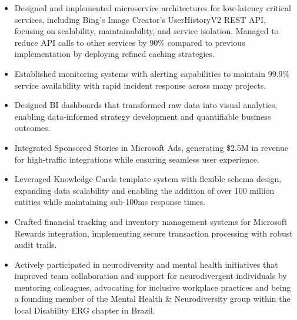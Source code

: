 \begin{itemize}
    \item \scriptsize{Designed and implemented microservice architectures for low-latency critical
        services, including Bing's Image Creator's UserHistoryV2 REST API, focusing on scalability,
        maintainability, and service isolation. Managed to reduce API calls to other services by 90\%
        compared to previous implementation by deploying refined caching strategies.}
    
    \item \scriptsize{Established monitoring systems with alerting capabilities to maintain 99.9\%
        service availability with rapid incident response across many projects.}

    \item \scriptsize{Designed BI dashboards that transformed raw data into visual analytics, enabling
        data-informed strategy development and quantifiable business outcomes.}

    \item \scriptsize{Integrated Sponsored Stories in Microsoft Ads, generating \$2.5M in revenue for
        high-traﬀic integrations while ensuring seamless user experience.}

    \item \scriptsize{Leveraged Knowledge Cards template system with flexible schema design, expanding
        data scalability and enabling the addition of over 100 million entities while maintaining
        sub-100ms response times.}

    \item \scriptsize{Crafted financial tracking and inventory management systems for Microsoft Rewards
        integration, implementing secure transaction processing with robust audit trails.}

    \item \scriptsize{Actively participated in neurodiversity and mental health initiatives that
        improved team collaboration and support for neurodivergent individuals by mentoring colleagues,
        advocating for inclusive workplace practices and being a founding member of the Mental Health \&
        Neurodiversity group within the local Disability ERG chapter in Brazil.}
\end{itemize}